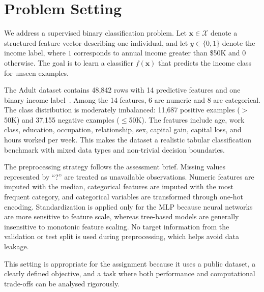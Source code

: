 \section{Problem Setting}
\label{sec:problem_setting}

We address a supervised binary classification problem. Let $\mathbf{x} \in \mathcal{X}$ denote a structured feature vector describing one individual, and let $y \in \{0,1\}$ denote the income label, where $1$ corresponds to annual income greater than \$50K and $0$ otherwise. The goal is to learn a classifier $f(\mathbf{x})$ that predicts the income class for unseen examples.

The Adult dataset contains 48,842 rows with 14 predictive features and one binary income label~\cite{uciadult}. Among the 14 features, 6 are numeric and 8 are categorical. The class distribution is moderately imbalanced: 11,687 positive examples ($>$50K) and 37,155 negative examples ($\leq$50K). The features include age, work class, education, occupation, relationship, sex, capital gain, capital loss, and hours worked per week. This makes the dataset a realistic tabular classification benchmark with mixed data types and non-trivial decision boundaries.

The preprocessing strategy follows the assessment brief. Missing values represented by ``?'' are treated as unavailable observations. Numeric features are imputed with the median, categorical features are imputed with the most frequent category, and categorical variables are transformed through one-hot encoding. Standardization is applied only for the MLP because neural networks are more sensitive to feature scale, whereas tree-based models are generally insensitive to monotonic feature scaling. No target information from the validation or test split is used during preprocessing, which helps avoid data leakage.

This setting is appropriate for the assignment because it uses a public dataset, a clearly defined objective, and a task where both performance and computational trade-offs can be analysed rigorously.
